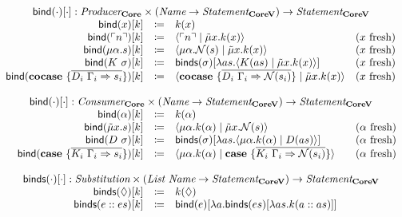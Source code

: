 \[
  \begin{array}{rcll}
    \multicolumn{4}{c}{\bind{\cdot}{\cdot} : \emph{Producer}_{\targetlang{}} \times (\emph{Name} \rightarrow \emph{Statement}_{\targetvar{}}) \rightarrow \emph{Statement}_{\targetvar{}}}\\
    \bind{x}{k} & \coloneq & k(x) & \\
    \bind{\lit{n}}{k} & \coloneq & \cut{\lit{n}}{\tilde{\mu}x.k(x)} & \fresh{x} \\
    \bind{\mu\alpha.s}{k} & \coloneq & \cut{\mu\alpha.\name{s}}{\tilde{\mu}x.k(x)} & \fresh{x} \\
    \bind{K\ \sigma}{k} & \coloneq & \binds{\sigma}{\lambda as.\cut{K(as)}{\tilde{\mu}x.k(x)}} & \fresh{x} \\
    \bind{\cocase{\overline{D_i\ \Gamma_i \Rightarrow s_i}}}{k} & \coloneq & \cut{\cocase{\overline{D_i\ \Gamma_i \Rightarrow \name{s_i}}}}{\tilde{\mu}x.k(x)} & \fresh{x} \\
    \\
    \multicolumn{4}{c}{\bind{\cdot}{\cdot} : \emph{Consumer}_{\targetlang{}} \times (\emph{Name} \rightarrow \emph{Statement}_{\targetvar{}}) \rightarrow \emph{Statement}_{\targetvar{}}}\\
    \bind{\alpha}{k} & \coloneq & k(\alpha) & \\
    \bind{\tilde{\mu}x.s}{k} & \coloneq & \cut{\mu\alpha.k(\alpha)}{\tilde{\mu}x.\name{s}} & \fresh{\alpha} \\
    \bind{D\ \sigma}{k} & \coloneq & \binds{\sigma}{\lambda as.\cut{\mu\alpha.k(\alpha)}{D(as)}} & \fresh{\alpha} \\
    \bind{\case{\overline{K_i\ \Gamma_i \Rightarrow s_i}}}{k} & \coloneq & \cut{\mu\alpha.k(\alpha)}{\case{\overline{K_i\ \Gamma_i \Rightarrow \name{s_i}}}} & \fresh{\alpha} \\
    \\
    \multicolumn{4}{c}{\binds{\cdot}{\cdot} : \emph{Substitution} \times (\emph{List Name} \rightarrow \emph{Statement}_{\targetvar{}}) \rightarrow \emph{Statement}_{\targetvar{}}}\\
    \binds{\nil}{k} & \coloneq & k(\nil) & \\
    \binds{e :: es}{k} & \coloneq & \bind{e}{\lambda a.\binds{es}{\lambda as.k(a :: as)}} & \\
  \end{array}
\]
